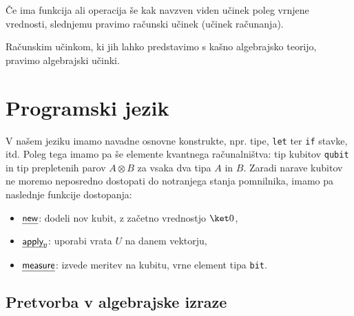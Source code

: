\begin{definition}
    Če ima funkcija ali operacija še kak navzven viden učinek poleg vrnjene vrednosti, slednjemu pravimo računski učinek (učinek računanja).
\end{definition}

\begin{definition}
    Računskim učinkom, ki jih lahko predstavimo s kašno algebrajsko teorijo, pravimo algebrajski učinki.
\end{definition}

\section{Programski jezik}

V našem jeziku\cite{algeff-lin-qpl} imamo navadne osnovne konstrukte,
npr. tipe, \texttt{let} ter \texttt{if} stavke, itd.
Poleg tega imamo pa še elemente kvantnega računalništva:
tip kubitov \texttt{qubit} in tip prepletenih parov \( A⊗B \) za vsaka dva tipa \(A\) in \(B\).
Zaradi narave kubitov ne moremo neposredno dostopati do notranjega stanja pomnilnika,
imamo pa naslednje funkcije dostopanja:
\begin{itemize}
    \item \(\eff{new}\): dodeli nov kubit, z začetno vrednostjo \(\ket 0\),
    \item \(\eff{apply}_{\g U}\): uporabi vrata \(U\) na danem vektorju,
    \item \(\eff{measure}\): izvede meritev na kubitu, vrne element tipa \texttt{bit}.
\end{itemize}


\subsection{Pretvorba v algebrajske izraze}

